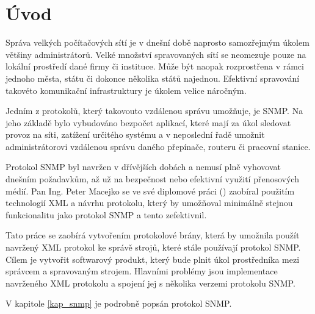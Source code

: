 \chapter{Úvod}
Správa velkých počítačových sítí je v dnešní době naprosto samozřejmým úkolem většiny administrátorů. Velké množství spravovaných sítí se neomezuje pouze na lokální prostředí dané firmy či instituce. Může být naopak rozprostřena 
v rámci jednoho města, státu či dokonce několika států najednou. Efektivní spravování takovéto komunikační infrastruktury je úkolem velice náročným.

Jedním z protokolů, který takovouto vzdálenou správu umožňuje, je SNMP. Na jeho základě bylo vybudováno bezpočet aplikací, které mají za úkol sledovat provoz na síti, zatížení určitého systému a v neposlední řadě umožnit administrátorovi
vzdálenou správu daného přepínače, routeru či pracovní stanice.

Protokol SNMP byl navržen v dřívějších dobách a nemusí plně vyhovovat dnešním požadavkům, až už na bezpečnost nebo efektivní využití přenosových médií. Pan Ing. Peter Macejko se ve své diplomové práci (\cite{macejko_dipl}) zaobíral použitím 
technologií XML a návrhu protokolu, který by umožňoval minimálně stejnou funkcionalitu jako protokol SNMP a tento zefektivnil.

Tato práce se zaobírá vytvořením protokolové brány, která by umožnila použít navržený XML protokol ke správě strojů, které stále používají protokol SNMP. Cílem je vytvořit softwarový produkt, který bude plnit úkol prostředníka mezi správcem a spravovaným
strojem. Hlavními problémy jsou implementace navrženého XML protokolu a spojení jej s několika verzemi protokolu SNMP.

V kapitole \ref{kap_snmp} je podrobně popsán protokol SNMP.


